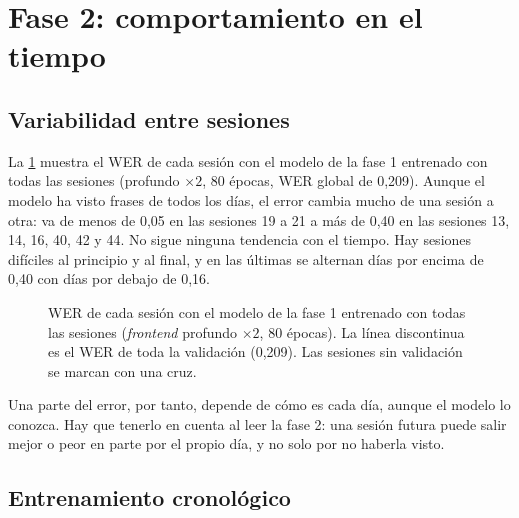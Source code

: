 \section{Fase 2: comportamiento en el tiempo}
\label{sec:res-fase2}

\subsection{Variabilidad entre sesiones}
\label{sec:res-variabilidad}

La \cref{fig:res-wer-sesion} muestra el WER de cada sesión con el modelo de la fase 1 entrenado con todas las sesiones (profundo $\times 2$, 80 épocas, WER global de 0,209). Aunque el modelo ha visto frases de todos los días, el error cambia mucho de una sesión a otra: va de menos de 0,05 en las sesiones 19 a 21 a más de 0,40 en las sesiones 13, 14, 16, 40, 42 y 44. No sigue ninguna tendencia con el tiempo. Hay sesiones difíciles al principio y al final, y en las últimas se alternan días por encima de 0,40 con días por debajo de 0,16.

\begin{figure}[htbp]
  \centering
  \caption{WER de cada sesión con el modelo de la fase 1 entrenado con todas las sesiones (\textit{frontend} profundo $\times 2$, 80 épocas). La línea discontinua es el WER de toda la validación (0,209). Las sesiones sin validación se marcan con una cruz.}
  \label{fig:res-wer-sesion}
\end{figure}

Una parte del error, por tanto, depende de cómo es cada día, aunque el modelo lo conozca. Hay que tenerlo en cuenta al leer la fase 2: una sesión futura puede salir mejor o peor en parte por el propio día, y no solo por no haberla visto.

\subsection{Entrenamiento cronológico}
\label{sec:res-cronologico}

